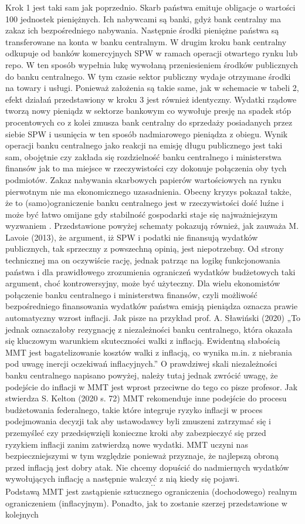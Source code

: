 \documentclass[
]{book}
\begin{document}
Krok 1 jest taki sam jak poprzednio. Skarb państwa emituje obligacje o wartości 100 jednostek pieniężnych. Ich nabywcami są banki, gdyż bank centralny ma zakaz ich bezpośredniego nabywania. Następnie środki pieniężne państwa są transferowane na konta w banku centralnym. W drugim kroku bank centralny odkupuje od banków komercyjnych SPW w ramach operacji otwartego rynku lub repo. W ten sposób wypełnia lukę wywołaną przeniesieniem środków publicznych do banku centralnego. W tym czasie sektor publiczny wydaje otrzymane środki na towary i usługi. Ponieważ założenia są takie same, jak w schemacie w tabeli 2, efekt działań przedstawiony w kroku 3 jest również identyczny. Wydatki rządowe tworzą nowy pieniądz w sektorze bankowym co wywołuje presję na spadek stóp procentowych co z kolei zmusza bank centralny do sprzedaży posiadanych przez siebie SPW i usunięcia w ten sposób nadmiarowego pieniądza z obiegu. Wynik operacji banku centralnego jako reakcji na emisję długu publicznego jest taki sam, obojętnie czy zakłada się rozdzielność banku centralnego i ministerstwa finansów jak to ma miejsce w rzeczywistości czy dokonuje połączenia oby tych podmiotów. Zakaz nabywania skarbowych papierów wartościowych na rynku pierwotnym nie ma ekonomicznego uzasadnienia. Obecny kryzys pokazał także, że to (samo)ograniczenie banku centralnego jest w rzeczywistości dość luźne i może być łatwo omijane gdy stabilność gospodarki staje się najważniejszym wyzwaniem . Przedstawione powyżej schematy pokazują również, jak zauważa M. Lavoie (2013), że argument, iż SPW i podatki nie finansują wydatków publicznych, tak sprzeczny z powszechną opinią, jest niepotrzebny. Od strony technicznej ma on oczywiście rację, jednak patrząc na logikę funkcjonowania państwa i dla prawidłowego zrozumienia ograniczeń wydatków budżetowych taki argument, choć kontrowersyjny, może być użyteczny. Dla wielu ekonomistów połączenie banku centralnego i ministerstwa finansów, czyli możliwość bezpośredniego finansowania wydatków państwa emisją pieniądza oznacza prawie automatyczny wzrost inflacji. Jak pisze na przykład prof. A. Sławiński (2020) „To jednak oznaczałoby rezygnację z niezależności banku centralnego, która okazała się kluczowym warunkiem skuteczności walki z inflacją. Ewidentną słabością MMT jest bagatelizowanie kosztów walki z inflacją, co wynika m.in. z niebrania pod uwagę inercji oczekiwań inflacyjnych.'' O prawdziwej skali niezależności banku centralnego napisano powyżej, należy tutaj jednak zwrócić uwagę, że podejście do inflacji w MMT jest wprost przeciwne do tego co pisze profesor. Jak stwierdza S. Kelton (2020 s. 72) MMT rekomenduje inne podejście do procesu budżetowania federalnego, takie które integruje ryzyko inflacji w proces podejmowania decyzji tak aby ustawodawcy byli zmuszeni zatrzymać się i przemyśleć czy przedsięwzięli konieczne kroki aby zabezpieczyć się przed ryzykiem inflacji zanim zatwierdzą nowe wydatki. MMT uczyni nas bezpieczniejszymi w tym względzie ponieważ przyznaje, że najlepszą obroną przed inflacją jest dobry atak. Nie chcemy dopuścić do nadmiernych wydatków wywołujących inflację a następnie walczyć z nią kiedy się pojawi. \[..\] Podstawą MMT jest zastąpienie sztucznego ograniczenia (dochodowego) realnym ograniczeniem (inflacyjnym). Ponadto, jak to zostanie szerzej przedstawione w kolejnych 
\end{document}
